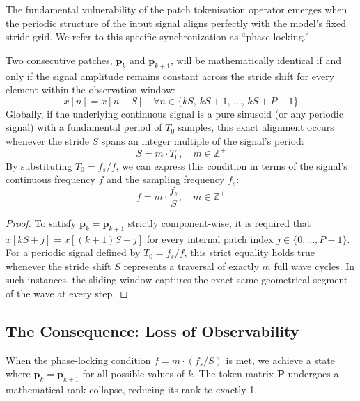 The fundamental vulnerability of the patch tokenisation operator emerges when the periodic structure of the input signal aligns perfectly with the model's fixed stride grid. We refer to this specific synchronization as ``phase-locking.''

\begin{proposition}
    Two consecutive patches, $\mathbf{p}_k$ and $\mathbf{p}_{k+1}$, will be mathematically identical if and only if the signal amplitude remains constant across the stride shift for every element within the observation window:
    \begin{equation}
        x[n] = x[n + S] \quad \forall n \in \{kS,\, kS+1,\, \ldots,\, kS+P-1\}
    \end{equation}
    Globally, if the underlying continuous signal is a pure sinusoid (or any periodic signal) with a fundamental period of $T_0$ samples, this exact alignment occurs whenever the stride $S$ spans an integer multiple of the signal's period:
    \begin{equation}
        \boxed{S = m \cdot T_0, \quad m \in \mathbb{Z}^+}
    \end{equation}
    By substituting $T_0 = f_s / f$, we can express this condition in terms of the signal's continuous frequency $f$ and the sampling frequency $f_s$:
    \begin{equation}
        f = m \cdot \frac{f_s}{S}, \quad m \in \mathbb{Z}^+
    \end{equation}
\end{proposition}

\begin{proof}
    To satisfy $\mathbf{p}_k = \mathbf{p}_{k+1}$ strictly component-wise, it is required that $x[kS + j] = x[(k+1)S + j]$ for every internal patch index $j \in \{0,\ldots,P-1\}$. For a periodic signal defined by $T_0 = f_s/f$, this strict equality holds true whenever the stride shift $S$ represents a traversal of exactly $m$ full wave cycles. In such instances, the sliding window captures the exact same geometrical segment of the wave at every step.
\end{proof}

\subsection{The Consequence: Loss of Observability}

When the phase-locking condition $f = m \cdot (f_s/S)$ is met, we achieve a state where $\mathbf{p}_k = \mathbf{p}_{k+1}$ for all possible values of $k$. The token matrix $\mathbf{P}$ undergoes a mathematical rank collapse, reducing its rank to exactly 1.

